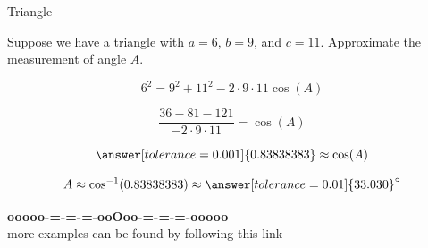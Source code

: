 \documentclass{ximera}
\begin{document}
\begin{example} Triangle 


Suppose we have a triangle with $a=6$, $b=9$, and $c=11$. Approximate the measurement of angle $A$.

\[    6^2 = 9^2  +  11^2  - 2 \cdot 9 \cdot 11 \cos(A)   \]


\[    \frac{36 - 81 - 121}{- 2 \cdot 9 \cdot 11} =    \cos(A)   \]

\[  \answer[tolerance=0.001]{0.83838383} \approx \cos(A)  \]


\[ A \approx \cos^{-1}(0.83838383)  \approx \answer[tolerance=0.01]{33.030}^{\circ}   \]


\end{example}














































\begin{onlineOnly}
\begin{center}
\textbf{\textcolor{green!50!black}{ooooo-=-=-=-ooOoo-=-=-=-ooooo}} \\

more examples can be found by following this link\\ 

\end{center}
\end{onlineOnly}
\end{document}
